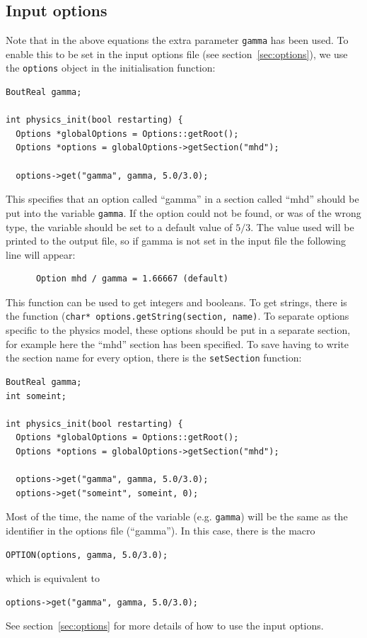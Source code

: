 \documentclass[12pt]{article}
\newcommand{\code}[1]{\texttt{#1}}
\begin{document}
\subsection{Input options}
\label{sec:inputopts}
Note that in the above equations the extra parameter \code{gamma} has been used. To enable this to be set
in the input options file (see section~\ref{sec:options}), we use the \code{options} object in the
initialisation function:
\begin{lstlisting}
BoutReal gamma;

int physics_init(bool restarting) {
  Options *globalOptions = Options::getRoot();
  Options *options = globalOptions->getSection("mhd");

  options->get("gamma", gamma, 5.0/3.0);
\end{lstlisting}
This specifies that an option called ``gamma'' in a section called ``mhd'' should be put into the variable \code{gamma}. If the option could not be found, or was of the wrong type, the variable should be set to a default value of $5/3$.
The value used will be printed to the output file, so if gamma is not set in the input file the following line will appear:
\begin{verbatim}
      Option mhd / gamma = 1.66667 (default)
\end{verbatim}
This function can be used to get integers and booleans. To get strings, there
is the function (\code{char* options.getString(section, name)}.
To separate options specific to the physics model, these options should be put in a separate
section, for example here the ``mhd'' section has been specified. To save having to write the section name for every option, there is the \code{setSection} function:
\begin{lstlisting}
BoutReal gamma;
int someint;

int physics_init(bool restarting) {
  Options *globalOptions = Options::getRoot();
  Options *options = globalOptions->getSection("mhd");

  options->get("gamma", gamma, 5.0/3.0);
  options->get("someint", someint, 0);
\end{lstlisting}
Most of the time, the name of the variable (e.g. \code{gamma}) will be
the same as the identifier in the options file (``gamma''). In this case,
there is the macro
\begin{lstlisting}[numbers=none]
OPTION(options, gamma, 5.0/3.0);
\end{lstlisting}
which is equivalent to
\begin{lstlisting}[numbers=none]
options->get("gamma", gamma, 5.0/3.0);
\end{lstlisting}
See section~\ref{sec:options} for more details of how to use the input options.
\end{document}
